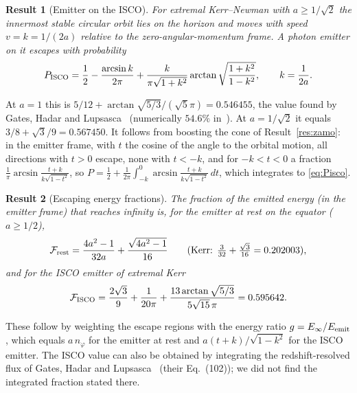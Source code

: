 \documentclass[11pt,a4paper]{article}
\newtheorem{result}{Result}
\theoremstyle{remark}
\numberwithin{equation}{section}
\begin{document}
\begin{result}[Emitter on the ISCO]\label{res:isco}
For extremal Kerr--Newman with $a\ge1/\sqrt2$ the innermost stable circular orbit lies on the horizon and moves
with speed $v=k=1/(2a)$ relative to the zero-angular-momentum frame. A photon emitter on it escapes with
probability
\begin{equation}
P_{\rm ISCO}=\frac12-\frac{\arcsin k}{2\pi}+\frac{k}{\pi\sqrt{1+k^2}}\arctan\sqrt{\frac{1+k^2}{1-k^2}},\qquad k=\frac1{2a}.
\label{eq:Pisco}
\end{equation}
\end{result}
At $a=1$ this is $5/12+\arctan\sqrt{5/3}/(\sqrt5\pi)=0.546455$, the value found by Gates, Hadar and
Lupsasca~\cite{GatesHadarLupsasca2021} (numerically $54.6\%$ in~\cite{Igata2020}). At $a=1/\sqrt2$ it equals
$3/8+\sqrt3/9=0.567450$. It follows from boosting the cone of Result~\ref{res:zamo}: in the emitter frame,
with $t$ the cosine of the angle to the orbital motion, all directions with $t>0$ escape, none with $t<-k$, and
for $-k<t<0$ a fraction $\frac1\pi\arcsin\frac{t+k}{k\sqrt{1-t^2}}$, so
$P=\frac12+\frac1{2\pi}\int_{-k}^0\arcsin\frac{t+k}{k\sqrt{1-t^2}}\,dt$, which integrates to \eqref{eq:Pisco}.

\begin{result}[Escaping energy fractions]\label{res:energy}
The fraction of the emitted energy (in the emitter frame) that reaches infinity is, for the emitter at rest on
the equator ($a\ge1/2$),
\begin{equation}
\mathcal F_{\rm rest}=\frac{4a^2-1}{32a}+\frac{\sqrt{4a^2-1}}{16}\qquad(\text{Kerr: }\tfrac3{32}+\tfrac{\sqrt3}{16}=0.202003),
\end{equation}
and for the ISCO emitter of extremal Kerr
\begin{equation}
\mathcal F_{\rm ISCO}=\frac{2\sqrt3}{9}+\frac{1}{20\pi}+\frac{13\arctan\sqrt{5/3}}{5\sqrt{15}\,\pi}=0.595642 .
\end{equation}
\end{result}
These follow by weighting the escape regions with the energy ratio $g=E_\infty/E_{\rm emit}$, which equals
$a\,n_\varphi$ for the emitter at rest and $a(t+k)/\sqrt{1-k^2}$ for the ISCO emitter. The ISCO value can also be
obtained by integrating the redshift-resolved flux of Gates, Hadar and Lupsasca~\cite{GatesHadarLupsasca2021}
(their Eq.~(102)); we did not find the integrated fraction stated there.
\end{document}

